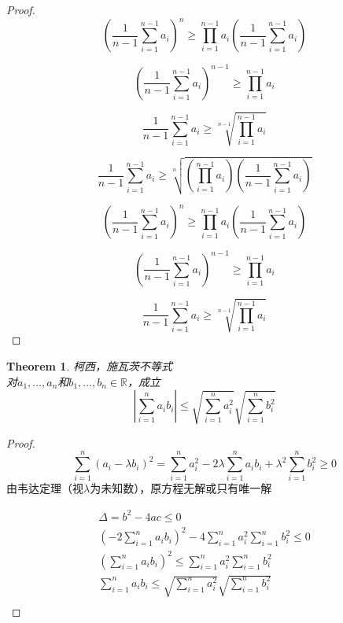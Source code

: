 \documentclass[10pt,a4paper]{book}
\newtheorem{theorem}{Theorem}[section]
\begin{document}
\begin{proof}
	\begin{equation}	
		(\frac{1}{n-1}\sum_{i=1}^{n-1}a_i)^n
		\geq \prod_{i=1}^{n-1}a_i(\frac{1}{n-1}\sum_{i=1}^{n-1}a_i)
	\end{equation}
	

	\begin{equation}	
		(\frac{1}{n-1}\sum_{i=1}^{n-1}a_i)^{n-1}
		\geq \prod_{i=1}^{n-1}a_i
	\end{equation}


	\begin{equation}		
		\frac{1}{n-1}\sum_{i=1}^{n-1}a_i
		\geq \sqrt[n-1]{\prod_{i=1}^{n-1}a_i}
	\end{equation}


	\begin{equation}
		\frac{1}{n-1}\sum_{i=1}^{n-1}a_i \geq \sqrt[n]{(\prod_{i=1}^{n-1}a_i)(\frac{1}{n-1}\sum_{i=1}^{n-1}a_i)}
	\end{equation}
	
	\begin{equation}
		( \frac{1}{n-1}\sum_{i=1}^{n-1}a_i )^n \geq \prod_{i=1}^{n-1}a_i(\frac{1}{n-1}\sum_{i=1}^{n-1}a_i)
	\end{equation}

	\begin{equation}
		( \frac{1}{n-1}\sum_{i=1}^{n-1}a_i )^{n-1} \geq \prod_{i=1}^{n-1}a_i
	\end{equation}
	
	\begin{equation}
		 \frac{1}{n-1}\sum_{i=1}^{n-1}a_i  \geq \sqrt[n-1]{\prod_{i=1}^{n-1}a_i}
	\end{equation}
	
	\end{proof}
	
	\begin{theorem}
		柯西，施瓦茨不等式\\	
		对$ a_1,\dots,a_n $和$ b_1, \dots ,b_n \in \mathbb{R}$，成立
		\begin{equation}
			|\sum_{i=1}^n a_ib_i|\leq \sqrt{\sum_{i=1}^n a_i^2}\sqrt{\sum_{i=1}^n b_i^2}
		\end{equation}
		\label{1.3.5}
	\end{theorem}
	\begin{proof}
		\[ \sum_{i=1}^n (a_i - \lambda b_i)^2 = \sum_{i=1}^n a_i^2 - 2\lambda \sum_{i=1}^n a_i b_i + \lambda^2 \sum_{i=1}^n b_i^2 \geq 0  \]
		由韦达定理（视$ \lambda $为未知数），原方程无解或只有唯一解
		
		\begin{equation*}
			\begin{aligned}
				 \Delta = b^2-4ac \leq 0\\
				 (-2\sum_{i=1}^n a_i b_i)^2-4\sum_{i=1}^na_i^2\sum_{i=1}^nb_i^2\leq 0\\	
				 (\sum_{i=1}^n a_i b_i)^2 \leq \sum_{i=1}^na_i^2\sum_{i=1}^nb_i^2\\
				 \sum_{i=1}^n a_i b_i \leq \sqrt{\sum_{i=1}^na_i^2}\sqrt{\sum_{i=1}^nb_i^2}\\
			 \end{aligned}
		\end{equation*}
	\end{proof}
\end{document}

